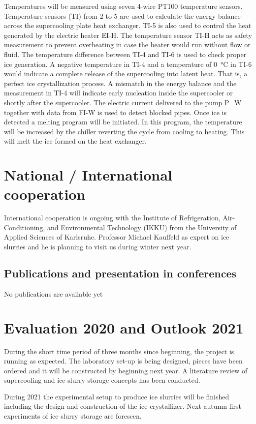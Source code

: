 \documentclass[english]{SFOEYearlyReportEnglish_2018}
\begin{document}
Temperatures will be measured using seven 4-wire PT100 temperature sensors. Temperature sensors (TI) from 2 to 5 are used to calculate the energy balance across the supercooling plate heat exchanger. TI-5 is also used to control the heat generated by the electric heater EI-H. The temperature sensor TI-H acts as safety measurement to prevent overheating in case the heater would run without flow or fluid. The temperature difference between TI-4 and TI-6 is used to check proper ice generation. A negative temperature in TI-4 and a temperature of \SI{0}{\celsius} in TI-6 would indicate a complete release of the  supercooling into latent heat. That is, a perfect ice crystallization process. A mismatch in the energy balance and the measurement in TI-4 will indicate early nucleation inside the supercooler or shortly after the supercooler. The electric current delivered to the pump  P\_W together with data from FI-W is used to detect blocked pipes. Once ice is detected a melting program will be initiated. In this program, the temperature will be increased by the chiller reverting the cycle from cooling to heating. This will melt the ice formed on the heat exchanger.





\section{National / International cooperation}

International cooperation is ongoing with the Institute of Refrigeration, Air-Conditioning, and Environmental Technology (IKKU) from the University of Applied Sciences of Karlsruhe. Professor Michael Kauffeld as expert on ice slurries and he is planning to visit us during winter next year.

\subsection{Publications and presentation in conferences}
\label{sec:publications}
No publications are available yet

\section{Evaluation 2020 and Outlook 2021}

During the short time period of three months since beginning, the project is running as expected. 
The laboratory set-up is being designed, pieces have been ordered and it will be constructed by beginning next year. A literature review of supercooling and ice slurry storage concepts has been conducted.

During 2021 the experimental setup to produce ice slurries will be finished including the design and construction of the ice crystallizer. Next autumn first experiments of ice slurry storage are foreseen.


%


%

\end{document}
